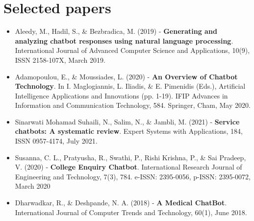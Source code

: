 \documentclass[12pt, twoside]{article}
\begin{document}
\section{Selected papers}
\begin{itemize}
\item Aleedy, M., Hadil, S., \& Bezbradica, M. (2019) - \textbf{Generating and analyzing chatbot responses using natural language processing}. International Journal of Advanced Computer Science and Applications, 10(9), ISSN 2158-107X, March 2019.
\item Adamopoulou, E., \& Moussiades, L. (2020) - \textbf{An Overview of Chatbot Technology}. In I. Maglogiannis, L. Iliadis, \& E. Pimenidis (Eds.), Artificial Intelligence Applications and Innovations (pp. 1-19). IFIP Advances in Information and Communication Technology, 584. Springer, Cham, May 2020.
\item Sinarwati Mohamad Suhaili, N., Salim, N., \& Jambli, M. (2021) - \textbf{Service chatbots: A systematic review}. Expert Systems with Applications, 184, ISSN 0957-4174, July 2021.
\item Susanna, C. L., Pratyusha, R., Swathi, P., Rishi Krishna, P., \& Sai Pradeep, V. (2020) - \textbf{College Enquiry Chatbot}. International Research Journal of Engineering and Technology, 7(3), 784. e-ISSN: 2395-0056, p-ISSN: 2395-0072, March 2020
\item Dharwadkar, R., \& Deshpande, N. A. (2018) - \textbf{A Medical ChatBot}. International Journal of Computer Trends and Technology, 60(1), June 2018.
\end{itemize}
\end{document}

